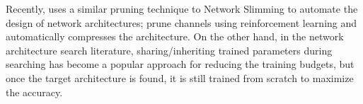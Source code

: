Recently, \cite{gordon2018morphnet} uses a similar pruning technique to Network Slimming \citep{liu2017learning} to automate the design of network architectures; \cite{amc} prune channels using reinforcement learning and automatically compresses the architecture. On the other hand, in the network architecture search literature, sharing/inheriting trained parameters \citep{sharing,darts} during searching has become a popular approach for  reducing the training budgets, but once the target architecture is found, it is still trained from scratch to maximize the accuracy. 
